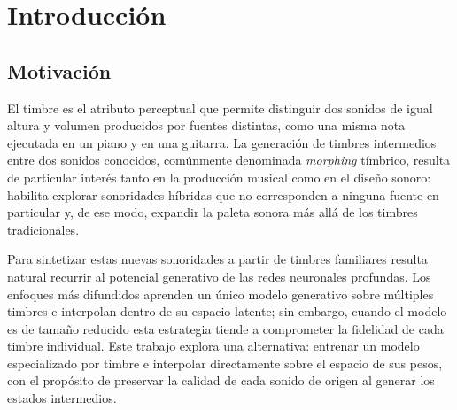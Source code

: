 \documentclass[12pt,a4paper,twoside]{tesis}
\begin{document}

\def\autor{Facundo González Barnator}
\def\tituloTesis{Morphing Tímbrico Mediante Interpolación de Pesos de Modelos VAE}
\def\runtitulo{Morphing Tímbrico Mediante Interpolación de Pesos de Modelos VAE}
\def\runtitle{Morphing Tímbrico Mediante Interpolación de Pesos de Modelos VAE}
\def\director{Pablo Riera}
\def\codirector{-}
\def\lugar{Buenos Aires, 2026}


\frontmatter
\pagestyle{empty}


\cleardoublepage

\cleardoublepage


\cleardoublepage
\tableofcontents

\mainmatter
\pagestyle{headings}


\chapter{Introducción}
\label{cap:introduccion}

\section{Motivación}

El timbre es el atributo perceptual que permite distinguir dos sonidos de igual altura y volumen producidos por fuentes distintas, como una misma nota ejecutada en un piano y en una guitarra. La generación de timbres intermedios entre dos sonidos conocidos, comúnmente denominada \emph{morphing} tímbrico, resulta de particular interés tanto en la producción musical como en el diseño sonoro: habilita explorar sonoridades híbridas que no corresponden a ninguna fuente en particular y, de ese modo, expandir la paleta sonora más allá de los timbres tradicionales.

Para sintetizar estas nuevas sonoridades a partir de timbres familiares resulta natural recurrir al potencial generativo de las redes neuronales profundas. Los enfoques más difundidos aprenden un único modelo generativo sobre múltiples timbres e interpolan dentro de su espacio latente; sin embargo, cuando el modelo es de tamaño reducido esta estrategia tiende a comprometer la fidelidad de cada timbre individual. Este trabajo explora una alternativa: entrenar un modelo especializado por timbre e interpolar directamente sobre el espacio de sus pesos, con el propósito de preservar la calidad de cada sonido de origen al generar los estados intermedios.
\end{document}
